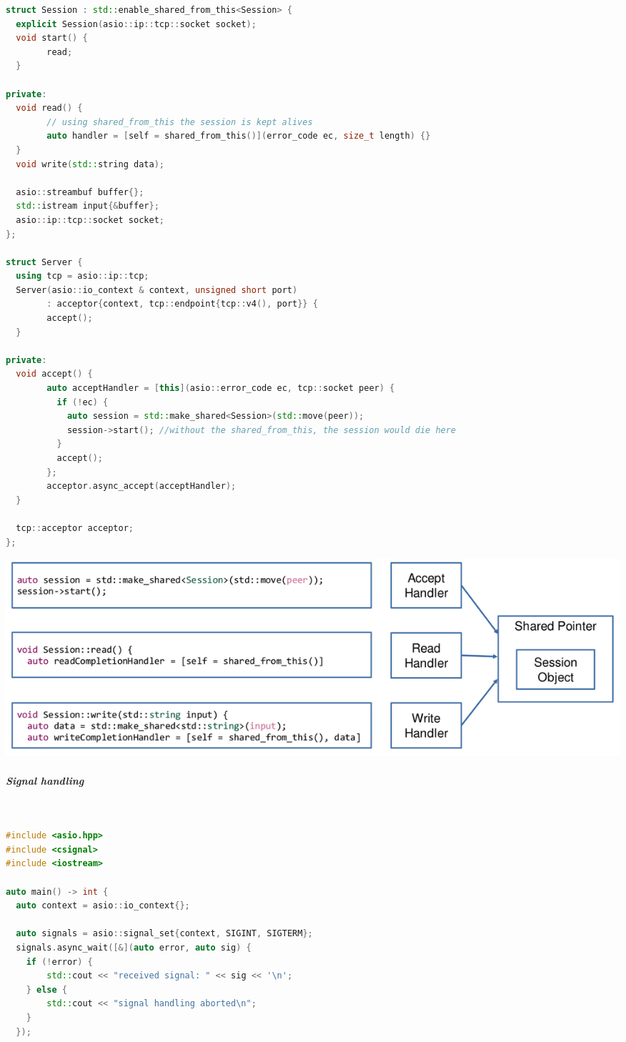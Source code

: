 \documentclass[11pt,twoside,landscape]{article}
\begin{document}
\begin{multicols}{2}
\begin{lstlisting}[language=c++,label=lst:orgc644190,caption={Async Example using ASIO},captionpos=b,numbers=none]
struct Session : std::enable_shared_from_this<Session> {
  explicit Session(asio::ip::tcp::socket socket);
  void start() {
        read;
  }

private:
  void read() {
        // using shared_from_this the session is kept alives
        auto handler = [self = shared_from_this()](error_code ec, size_t length) {}
  }
  void write(std::string data);

  asio::streambuf buffer{};
  std::istream input{&buffer};
  asio::ip::tcp::socket socket;
};

struct Server {
  using tcp = asio::ip::tcp;
  Server(asio::io_context & context, unsigned short port)
        : acceptor{context, tcp::endpoint{tcp::v4(), port}} {
        accept();
  }

private:
  void accept() {
        auto acceptHandler = [this](asio::error_code ec, tcp::socket peer) {
          if (!ec) {
            auto session = std::make_shared<Session>(std::move(peer));
            session->start(); //without the shared_from_this, the session would die here
          }
          accept();
        };
        acceptor.async_accept(acceptHandler);
  }

  tcp::acceptor acceptor;
};
\end{lstlisting}


{
\begin{center}
\includegraphics[width=.9\linewidth]{img/asio_keep_session_alive.png}
\end{center}
\label{fig:keep-session-alive}
}
\subparagraph{Signal handling} \
\label{sec:org8aa9178}
\begin{lstlisting}[language=c++,label=lst:org8f97317,caption={Example for signal handling using ASIO},captionpos=b,numbers=none]
#include <asio.hpp>
#include <csignal>
#include <iostream>

auto main() -> int {
  auto context = asio::io_context{};

  auto signals = asio::signal_set{context, SIGINT, SIGTERM};
  signals.async_wait([&](auto error, auto sig) {
    if (!error) {
        std::cout << "received signal: " << sig << '\n';
    } else {
        std::cout << "signal handling aborted\n";
    }
  });


\end{lstlisting}
\end{multicols}
\end{document}
